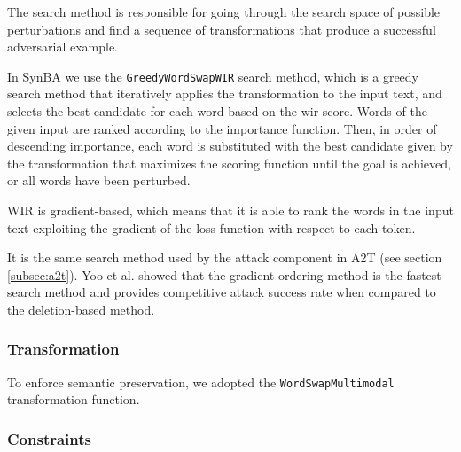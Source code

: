The search method is responsible for going through the search space of possible perturbations and  find a sequence of transformations that produce a successful adversarial example.

In SynBA we use the \texttt{GreedyWordSwapWIR} search method, which is a greedy search method that iteratively applies the transformation to the input text, and selects the best candidate for each word based on the \acrfull{wir} score.
Words of the given input are ranked according to the importance function. Then, in order of descending importance, each word is substituted with the best candidate given by the transformation
that maximizes the scoring function until the goal is achieved, or all words have been perturbed.

WIR is gradient-based, which means that it is able to rank the words in the input text exploiting the gradient of the loss function with respect to each token.

It is the same search method used by the attack component in A2T (see section \ref{subsec:a2t}).
Yoo et al. \cite{journals/corr/abs-2009-06368} showed that the gradient-ordering method is the fastest search method and provides competitive attack success rate when compared to the deletion-based method.

\subsubsection{Transformation}\label{subsubsec:transformation}

To enforce semantic preservation, we adopted the \texttt{WordSwapMultimodal} transformation function.





\subsubsection{Constraints}\label{subsubsec:constraints}

